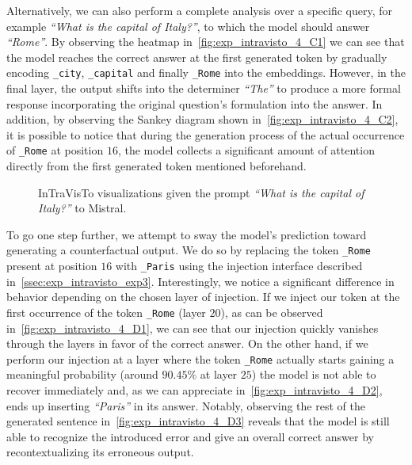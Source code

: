 Alternatively, we can also perform a complete analysis over a specific query, for example \emph{``What is the capital of Italy?''}, to which the model should answer \emph{``Rome''}.
By observing the heatmap in~\cref{fig:exp_intravisto_4_C1} we can see that the model reaches the correct answer at the first generated token by gradually encoding \texttt{\_city}, \texttt{\_capital} and finally \texttt{\_Rome} into the embeddings.
However, in the final layer, the output shifts into the determiner \emph{``The''} to produce a more formal response incorporating the original question's formulation into the answer.
In addition, by observing the Sankey diagram shown in~\cref{fig:exp_intravisto_4_C2}, it is possible to notice that during the generation process of the actual occurrence of \texttt{\_Rome} at position $16$, the model collects a significant amount of attention directly from the first generated token mentioned beforehand.

\begin{figure}[tp!]
    \centering
    \quad
    \caption{InTraVisTo visualizations given the prompt \emph{``What is the capital of Italy?''} to Mistral.}
    \label{fig:exp_intravisto_4_C}
\end{figure}

To go one step further, we attempt to sway the model's prediction toward generating a counterfactual output.
We do so by replacing the token \texttt{\_Rome} present at position $16$ with \texttt{\_Paris} using the injection interface described in~\cref{ssec:exp_intravisto_exp3}.
Interestingly, we notice a significant difference in behavior depending on the chosen layer of injection.
If we inject our token at the first occurrence of the token \texttt{\_Rome} (layer $20$), as can be observed in~\cref{fig:exp_intravisto_4_D1}, we can see that our injection quickly vanishes through the layers in favor of the correct answer.
On the other hand, if we perform our injection at a layer where the token \texttt{\_Rome} actually starts gaining a meaningful probability (around $90.45\%$ at layer $25$) the model is not able to recover immediately and, as we can appreciate in~\cref{fig:exp_intravisto_4_D2}, ends up inserting \emph{``Paris''} in its answer.
Notably, observing the rest of the generated sentence in~\cref{fig:exp_intravisto_4_D3} reveals that the model is still able to recognize the introduced error and give an overall correct answer by recontextualizing its erroneous output.

